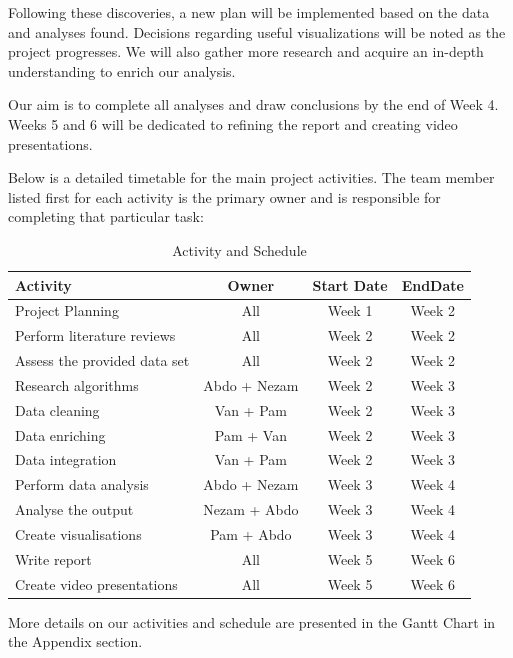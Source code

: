 \documentclass[mstat,12pt]{unswthesis}
\begin{document}
Following these discoveries, a new plan will be implemented based on the
data and analyses found. Decisions regarding useful visualizations will
be noted as the project progresses. We will also gather more research
and acquire an in-depth understanding to enrich our analysis.

Our aim is to complete all analyses and draw conclusions by the end of
Week 4. Weeks 5 and 6 will be dedicated to refining the report and
creating video presentations.

Below is a detailed timetable for the main project activities. The team
member listed first for each activity is the primary owner and is
responsible for completing that particular task:

\begin{table}[!ht]
\begin{center}
\begin{tabular}{|l|c|c|c|}
\hline
Activity & Owner & Start Date & EndDate \\
\hline
Project Planning & All & Week 1 & Week 2 \\
\hline
Perform literature reviews & All & Week 2 & Week 2 \\
\hline
Assess the provided data set & All & Week 2 & Week 2 \\
\hline
Research algorithms & Abdo + Nezam & Week 2 & Week 3 \\
\hline
Data cleaning & Van + Pam & Week 2 & Week 3 \\
\hline
Data enriching & Pam + Van & Week 2 & Week 3 \\
\hline
Data integration & Van + Pam & Week 2 & Week 3 \\
\hline
Perform data analysis & Abdo + Nezam & Week 3 & Week 4 \\
\hline
Analyse the output & Nezam + Abdo & Week 3 & Week 4 \\
\hline
Create visualisations & Pam + Abdo & Week 3 & Week 4 \\
\hline
Write report & All & Week 5 & Week 6 \\
\hline
Create video presentations & All & Week 5 & Week 6 \\
\hline
\end{tabular}
\caption{\label{activity-schedule-table}Activity and Schedule}
\end{center}
\end{table}

More details on our activities and schedule are presented in the Gantt
Chart in the Appendix section.
\end{document}

